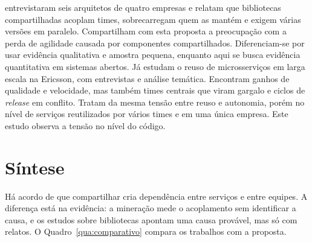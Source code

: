  entrevistaram seis arquitetos de quatro empresas e relatam que bibliotecas compartilhadas acoplam times, sobrecarregam quem as mantém e exigem várias versões em paralelo. Compartilham com esta proposta a preocupação com a perda de agilidade causada por componentes compartilhados. Diferenciam-se por usar evidência qualitativa e amostra pequena, enquanto aqui se busca evidência quantitativa em sistemas abertos. Já  estudam o reuso de microsserviços em larga escala na Ericsson, com entrevistas e análise temática. Encontram ganhos de qualidade e velocidade, mas também times centrais que viram gargalo e ciclos de \textit{release} em conflito. Tratam da mesma tensão entre reuso e autonomia, porém no nível de serviços reutilizados por vários times e em uma única empresa. Este estudo observa a tensão no nível do código.

\section{Síntese}
\label{sec:sintese}

Há acordo de que compartilhar cria dependência entre serviços e entre equipes. A diferença está na evidência: a mineração mede o acoplamento sem identificar a causa, e os estudos sobre bibliotecas apontam uma causa provável, mas só com relatos. O Quadro~\ref{qua:comparativo} compara os trabalhos com a proposta.


